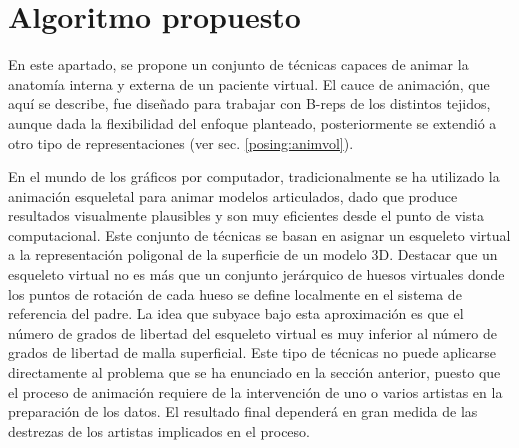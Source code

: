 \section{Algoritmo propuesto}
\label{posing:method}
En este apartado, se propone un conjunto de técnicas capaces de animar la anatomía interna y externa de un paciente virtual. El cauce de animación, que aquí se describe, fue diseñado para trabajar con \acs{B-rep}s de los distintos tejidos, aunque dada la flexibilidad del enfoque planteado, posteriormente se extendió a otro tipo de representaciones (ver sec. \ref{posing:animvol}). 
%

En el mundo de los gráficos por computador, tradicionalmente\del{,} se ha utilizado la animación esqueletal para animar modelos articulados, dado que produce resultados visualmente plausibles y son muy eficientes desde el punto de vista computacional. Este conjunto de técnicas se basan en asignar un esqueleto virtual a la representación poligonal de la superficie de un modelo 3D.  Destacar que un esqueleto virtual no es más que un conjunto jerárquico de huesos virtuales donde los puntos de rotación de cada hueso se define localmente en el sistema de referencia del padre. 
La idea que subyace bajo esta aproximación es que el número de grados de libertad del esqueleto virtual es muy inferior al número de grados de libertad de malla superficial. Este tipo de técnicas no puede aplicarse directamente al problema que se ha enunciado en la sección anterior, puesto que el proceso de animación requiere de la intervención de uno o varios artistas en la preparación de los datos. El resultado final dependerá en gran medida de las destrezas de los artistas implicados en el proceso. 

